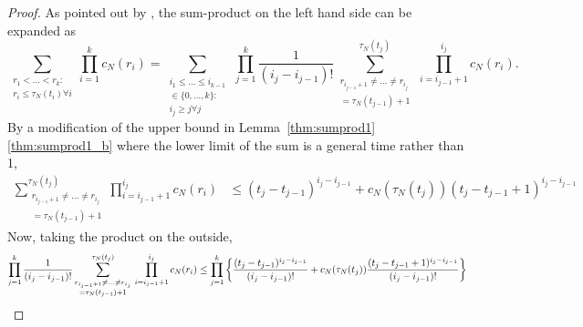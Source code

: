 \documentclass{article}
\newcommand{\1}[1]{\mathbbm{1}_{#1}}
\begin{document}
\begin{proof}
As pointed out by \citet[p.~460]{mohle1999}, the sum-product on the left hand side can be expanded as
\begin{equation}
\sum_{\substack{r_1<\dots<r_k :\\ r_i\leq \tau_N(t_i) \forall i}} 
        \prod_{i=1}^k c_N(r_i)
= \sum_{\substack{i_1\leq \dots\leq i_{k-1}\\ \in \{0,\dots,k\} :\\ 
        i_j \geq j \forall j}} \, \prod_{j=1}^k \frac{1}{(i_j - i_{j-1})!}
        \sum_{\substack{ r_{i_{j-1}+1} \neq \dots \neq r_{i_j} \\ = \tau_N(t_{j-1})+1}}        
        ^{\tau_N(t_j)}  \,\prod_{i=i_{j-1}+1}^{i_j} c_N(r_i) .
\end{equation}
By a modification of the upper bound in Lemma~\ref{thm:sumprod1}\ref{thm:sumprod1_b} where the lower limit of the sum is a general time rather than 1,
\begin{align}
\sum_{\substack{ r_{i_{j-1}+1} \neq \dots \neq r_{i_j} \\ = 
        \tau_N(t_{j-1})+1 }}^{\tau_N(t_j)}
        \prod_{i=i_{j-1}+1}^{i_j} c_N(r_i)
&\leq (t_j - t_{j-1})^{i_j - i_{j-1}} 
        + c_N(\tau_N(t_j)) ( t_j - t_{j-1} +1 )^{i_j - i_{j-1}} %
\end{align}
Now, taking the product on the outside,
\begin{align}
\prod_{j=1}^k \frac{1}{(i_j - i_{j-1})!}
        \sum_{\substack{ r_{i_{j-1}+1} \neq \dots \neq r_{i_j} \\ = \tau_N(t_{j-1})+1}}        
        ^{\tau_N(t_j)}  \,\prod_{i=i_{j-1}+1}^{i_j} c_N(r_i)
&\leq \prod_{j=1}^k \left\{ \frac{(t_j - t_{j-1})^{i_j - i_{j-1}}}{(i_j - i_{j-1})!}  
        + c_N(\tau_N(t_j)) \frac{( t_j - t_{j-1} +1 )^{i_j - i_{j-1}}}{(i_j - i_{j-1})!} \right\} 
        \notag\\

\end{align}
\end{proof}
\end{document}
